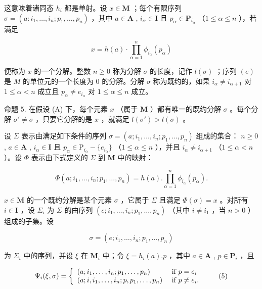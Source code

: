 这意味着诸同态 \(h_i\) 都是单射。设 \(x \in \mathbf{M}\) ；每个有限序列 \(\sigma = (a: i_1, \ldots, i_n; p_1, \ldots, p_n)\) ，其中 \(a \in \mathbf{A}\) , \(i_\alpha \in \mathbf{I}\) 且 \(p_\alpha \in \mathbf{P}_{i_\alpha}\) （\(1 \leqslant \alpha \leqslant n\) ），若满足

\[
x = h (a) \cdot \prod_ {\alpha = 1} ^ {n} \phi_ {i _ {\alpha}} (p _ {\alpha})\tag{3}
\]

便称为 \(x\) 的一个分解。整数 \(n \geqslant 0\) 称为分解 \(\sigma\) 的长度，记作 \(l(\sigma)\) ；序列 \((e)\) 是 \(M\) 的单位元的一个长度为 0 的分解。分解 \(\sigma\) 称为既约的，如果 \(i_{\alpha} \neq i_{\alpha + 1}\) 对 \(1 \leqslant \alpha < n\) 成立且 \(p_{\alpha} \neq e_{i_{\alpha}}\) 对 \(1 \leqslant \alpha \leqslant n\) 成立。

命题 5. 在假设 (A) 下，每个元素 \(x\) （属于 \(\mathbf{M}\) ）都有唯一的既约分解 \(\sigma\) 。每个分解 \(\sigma' \neq \sigma\) ，只要它分解的是 \(x\) ，就满足 \(l(\sigma') > l(\sigma)\) 。


设 \(\Sigma\) 表示由满足如下条件的序列 \(\sigma = (a; i_1, \ldots, i_n; p_1, \ldots, p_n)\) 组成的集合： \(n \geqslant 0\) , \(a \in \mathbf{A}\) , \(i_\alpha \in \mathbf{I}\) 且 \(p_\alpha \in \mathrm{P}_{i_\alpha} - \{e_{i_\alpha}\}\) （\(1 \leqslant \alpha \leqslant n\) ），并且 \(i_\alpha \neq i_{\alpha+1}\) （\(1 \leqslant \alpha < n\) ）。设 \(\Phi\) 表示由下式定义的 \(\Sigma\) 到 \(\mathbf{M}\) 中的映射：

\[
\Phi (a; i _ {1}, \dots , i _ {n}; p _ {1}, \dots , p _ {n}) = h (a). \prod_ {\alpha = 1} ^ {n} \phi_ {i _ {\alpha}} (p _ {\alpha}).\tag{4}
\]

\(x \in \mathbf{M}\) 的一个既约分解是某个元素 \(\sigma\) ，它属于 \(\Sigma\) 且满足 \(\Phi(\sigma) = x\) 。对所有 \(i \in \mathbf{I}\) ，设 \(\Sigma_i\) 为 \(\Sigma\) 的由序列 \((e; i_1, \ldots, i_n; p_1, \ldots, p_n)\) （其中 \(i \neq i_1\) ，当 \(n > 0\) ）组成的子集。设

\[
\sigma = (e; i _ {1}, \dots , i _ {n}; p _ {1}, \dots , p _ {n})
\]

为 \(\Sigma_{i}\) 中的序列，并设 \(\xi\) 在 \(\mathbf{M}_i\) 中；令 \(\xi = h_i(a).p\) ，其中 \(a\in \mathbf{A}\) , \(p\in \mathbf{P}_i\) ，且

\[
\Psi_ {i} (\xi , \sigma) = \left\{ \begin{array}{l l} (a; i _ {1}, \dots , i _ {n}; p _ {1}, \dots , p _ {n}) & \text { if } p = e _ {i} \\ (a; i, i _ {1}, \dots , i _ {n}; p, p _ {1}, \dots , p _ {n}) & \text { if } p \neq e _ {i}. \end{array} \right.\tag{5}
\]

